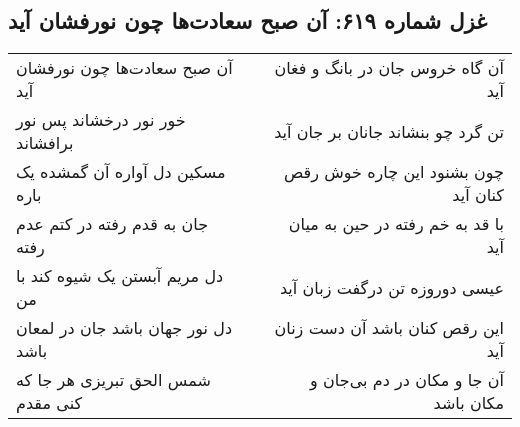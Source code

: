 \begin{center}
\section*{غزل شماره ۶۱۹: آن صبح سعادت‌ها چون نورفشان آید}
\label{sec:0619}
\begin{longtable}{l p{0.5cm} r}
آن صبح سعادت‌ها چون نورفشان آید
&&
آن گاه خروس جان در بانگ و فغان آید
\\
خور نور درخشاند پس نور برافشاند
&&
تن گرد چو بنشاند جانان بر جان آید
\\
مسکین دل آواره آن گمشده یک باره
&&
چون بشنود این چاره خوش رقص کنان آید
\\
جان به قدم رفته در کتم عدم رفته
&&
با قد به خم رفته در حین به میان آید
\\
دل مریم آبستن یک شیوه کند با من
&&
عیسی دوروزه تن درگفت زبان آید
\\
دل نور جهان باشد جان در لمعان باشد
&&
این رقص کنان باشد آن دست زنان آید
\\
شمس الحق تبریزی هر جا که کنی مقدم
&&
آن جا و مکان در دم بی‌جان و مکان باشد
\\
\end{longtable}
\end{center}

